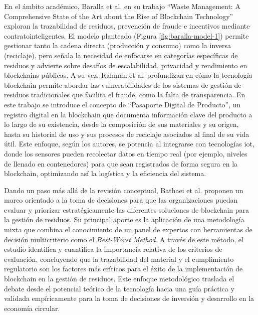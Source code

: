 En el ámbito académico, Baralla et al. en su trabajo ``Waste Management: A Comprehensive State of the Art about the Rise of Blockchain Technology'' \cite{baralla2023waste} exploran la trazabilidad de residuos, prevención de fraude e incentivos mediante \glspl{contratointeligente}. El modelo planteado (Figura \ref{fig:baralla-model-1}) permite gestionar tanto la cadena directa (producción y consumo) como la inversa (reciclaje), pero señala la necesidad de enfocarse en categorías específicas de residuos y advierte sobre desafíos de escalabilidad, privacidad y rendimiento en blockchains públicas. A su vez, Rahman et al. \cite{rahman2025traceable} profundizan en cómo la tecnología blockchain permite abordar las vulnerabilidades de los sistemas de gestión de residuos tradicionales que facilita el fraude, como la falta de transparencia. En este trabajo se introduce el concepto de ``Pasaporte Digital de Producto'', un registro digital en la blockchain que documenta información clave del producto a lo largo de su existencia, desde la composición de sus materiales y su origen, hasta su historial de uso y sus procesos de reciclaje asociados al final de su vida útil. Este enfoque, según los autores, se potencia al integrarse con tecnologías \acrshort{iot}, donde los sensores pueden recolectar datos en tiempo real (por ejemplo, niveles de llenado en contenedores) para que sean registrados de forma segura en la blockchain, optimizando así la logística y la eficiencia del sistema.

Dando un paso más allá de la revisión conceptual, Bathaei et al. \cite{bathaei2025blockchain} proponen un marco orientado a la toma de decisiones para que las organizaciones puedan evaluar y priorizar estratégicamente las diferentes soluciones de blockchain para la gestión de residuos. Su principal aporte es la aplicación de una metodología mixta que combina el conocimiento de un panel de expertos con herramientas de decisión multicriterio como el \textit{Best-Worst Method}. A través de este método, el estudio identifica y cuantifica la importancia relativa de los criterios de evaluación, concluyendo que la trazabilidad del material y el cumplimiento regulatorio son los factores más críticos para el éxito de la implementación de blockchain en la gestión de residuos. Este enfoque metodológico traslada el debate desde el potencial teórico de la tecnología hacia una guía práctica y validada empíricamente para la toma de decisiones de inversión y desarrollo en la economía circular.

